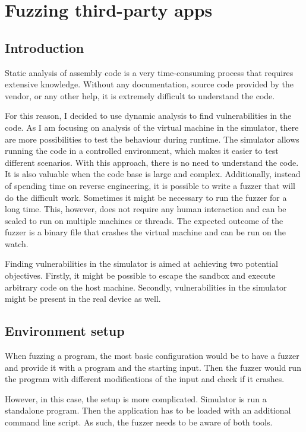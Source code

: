 \chapter{Fuzzing third-party apps} \label{sec:fuzzing}
\section{Introduction}
Static analysis of assembly code is a very time-consuming process that requires extensive knowledge.
Without any documentation, source code provided by the vendor, or any other help, it is extremely difficult to understand the code.

For this reason, I decided to use dynamic analysis to find vulnerabilities in the code.
As I am focusing on analysis of the virtual machine in the simulator, there are more possibilities to test the behaviour during runtime.
The simulator allows running the code in a controlled environment, which makes it easier to test different scenarios.
With this approach, there is no need to understand the code.
It is also valuable when the code base is large and complex.
Additionally, instead of spending time on reverse engineering, it is possible to write a fuzzer that will do the difficult work.
Sometimes it might be necessary to run the fuzzer for a long time.
This, however, does not require any human interaction and can be scaled to run on multiple machines or threads.
The expected outcome of the fuzzer is a binary file that crashes the virtual machine and can be run on the watch.

Finding vulnerabilities in the simulator is aimed at achieving two potential objectives.
Firstly, it might be possible to escape the sandbox and execute arbitrary code on the host machine.
Secondly, vulnerabilities in the simulator might be present in the real device as well.

\section{Environment setup}
When fuzzing a program, the most basic configuration would be to have a fuzzer and provide it with a program and the starting input.
Then the fuzzer would run the program with different modifications of the input and check if it crashes.

However, in this case, the setup is more complicated.
Simulator is run a standalone program.
Then the application has to be loaded with an additional command line script.
As such, the fuzzer needs to be aware of both tools.

